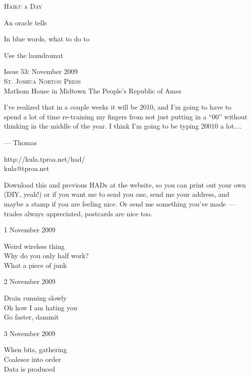 \documentclass[12pt]{article}
\begin{document}
\begin{center}
{\fontsize{36}{48}\selectfont \textsc{Haiku a Day }}
\end{center}

\vspace*{3.5cm}

{\fontsize{26}{52}\selectfont 
An oracle tells 
	 
In blue words, what to do to 
	 
Use the laundromat

}

\vspace*{5.0cm}
\begin{center}
{\large{Issue 53: November 2009}} \\[5mm]
{\fontsize{8}{8}\selectfont  \textsc{ St. Joshua Norton Press }} \\[1mm]
{\fontsize{6}{6}\selectfont Mathom House in Midtown \textbar The People's Republic of Ames }
\end{center}


\newpage

I've realized that in a couple weeks it will be 2010, and I'm
going to have to spend a lot of time re-training my fingers 
from not just putting in a ``00'' without thinking in the
middle of the year. I think I'm going to be typing 20010
a lot....

--- Thomas

http://kula.tproa.net/had/ \\
kula@tproa.net

Download this and previous HADs at the website, so you can
print out your own (DIY, yeah!) or if you want me to send
you one, send me your address, and maybe a stamp if you
are feeling nice. Or send me something you've made ---
trades always appreciated, postcards are nice too.

\vspace*{2cm}

1 November 2009

Weird wireless thing \\
Why do you only half work? \\
What a piece of junk

2 November 2009

Drain running slowly \\
Oh how I am hating you \\
Go faster, dammit

\newpage

3 November 2009

When bits, gathering \\
Coalesce into order \\
Data is produced
\end{document}
